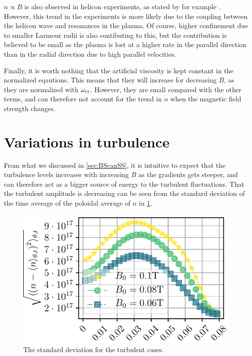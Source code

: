$n\propto B$ is also observed in helicon experiments, as stated by for example \cite{Tynan2006a}.
However, this trend in the experiments is more likely due to the coupling between the helicon wave and resonances in the plasma.
Of course, higher confinement due to smaller Larmour radii is also contibuting to this, but the contribution is believed to be small as the plasma is lost at a higher rate in the parallel direction than in the radial direction due to high parallel velocities.

Finally, it is worth nothing that the artificial viscosity is kept constant in the normalized eqautions.
This means that they will increase for decreasing $B$, as they are normalized with $\omega_{ci}$.
However, they are small compared with the other terms, and can therefore not account for the trend in $n$ when the magnetic field strength changes.

\section{Variations in turbulence}
%
From what we discussed in \cref{sec:BScanSS}, it is intuitive to expect that the turbulence levels increases with increasing $B$ as the gradients gets steeper, and can therefore act as a bigger source of energy to the turbulent fluctuations.
That the turbulent amplitude is decreasing can be seen from the standard deviation of the time average of the poloidal average of $n$ in \cref{fig:BScanPosOfFluct}.
%
\begin{figure}[htb]
    \centering
    \includegraphics{fig/results/bScan/BScanPosOfFluct}
    \caption{The standard deviation for the turbulent cases.}
    \label{fig:BScanPosOfFluct}
\end{figure}
%

